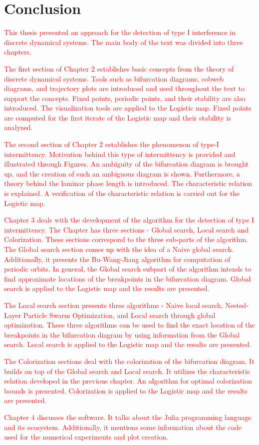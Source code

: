 \chapter{Conclusion}

\textcolor{red}{
This thesis presented an approach for the detection of type I interference in discrete dynamical systems.
The main body of the text was divided into three chapters.
}
\par
\textcolor{red}{
The first section of Chapter 2 establishes basic concepts from the theory of discrete dynamical systems.
Tools such as bifurcation diagrams, cobweb diagrams, and trajectory plots are introduced and used throughout the text to support the concepts.
Fixed points, periodic points, and their stability are also introduced.
The visualization tools are applied to the Logistic map.
Fixed points are computed for the first iterate of the Logistic map and their stability is analyzed.
}
\par
\textcolor{red}{
The second section of Chapter 2 establishes the phenomenon of type-I intermittency.
Motivation behind this type of intermittency is provided and illustrated through Figures.
An ambiguity of the bifurcation diagram is brought up, and the creation of such an ambiguous diagram is shown.
Furthermore, a theory behind the laminar phase length is introduced.
The characteristic relation is explained.
A verification of the characteristic relation is carried out for the Logistic map.
}
\par
\textcolor{red}{
Chapter 3 deals with the development of the algorithm for the detection of type I intermittency.
The Chapter has three sections - Global search, Local search and Colorization.
These sections correspond to the three sub-parts of the algorithm.
}
\textcolor{red}{
The Global search section comes up with the idea of a Naive global search.
Additionally, it presents the Bu-Wang-Jiang algorithm for computation of periodic orbits.
In general, the Global search subpart of the algorithm intends to find approximate locations of the breakpoints in the bifurcation diagram.
Global search is applied to the Logistic map and the results are presented.
}
\par
\textcolor{red}{
The Local search section presents three algorithms - Naive local search, Nested-Layer Particle Swarm Optimization, and Local search through global optimization.
These three algorithms can be used to find the exact location of the breakpoints in the bifurcation diagram by using information from the Global search.
Local search is applied to the Logistic map and the results are presented.
}
\par
\textcolor{red}{
The Colorization sections deal with the colorization of the bifurcation diagram.
It builds on top of the Global search and Local search.
It utilizes the characteristic relation developed in the previous chapter.
An algorithm for optimal colorization bounds is presented.
Colorization is applied to the Logistic map and the results are presented.
}
\par
\textcolor{red}{
Chapter 4 discusses the software.
It talks about the Julia programming language and its ecosystem.
Additionally, it mentions some information about the code used for the numerical experiments and plot creation.
}

